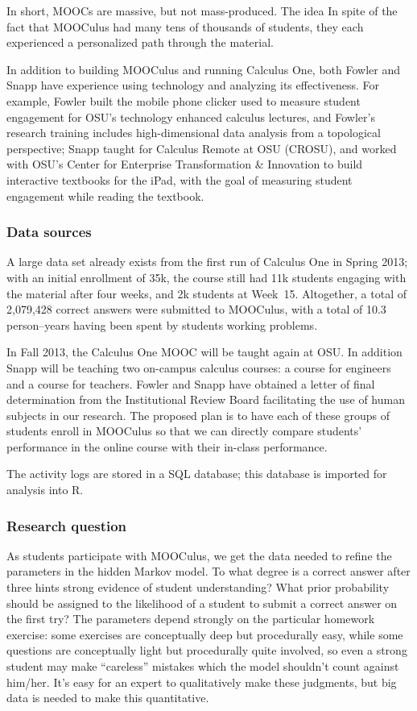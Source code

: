\documentclass[12pt]{article}
\begin{document}
In short, MOOCs are massive, but not mass-produced.  The idea In spite
of the fact that MOOCulus had many tens of thousands of students, they
each experienced a personalized path through the material.

In addition to building MOOCulus and running Calculus One, both Fowler
and Snapp have experience using technology and analyzing its
effectiveness.  For example, Fowler built the mobile phone clicker
used to measure student engagement for OSU's technology enhanced
calculus lectures, and Fowler's research training includes
high-dimensional data analysis from a topological perspective; Snapp
taught for Calculus Remote at OSU (CROSU), and worked with OSU's
Center for Enterprise Transformation \& Innovation to build
interactive textbooks for the iPad, with the goal of measuring student
engagement while reading the textbook.

\subsubsection*{Data sources}

A large data set already exists from the first run of Calculus One in
Spring 2013; with an initial enrollment of 35k, the course still had
11k students engaging with the material after four weeks, and 2k
students at Week~15.  Altogether, a total of 2,079,428 correct answers
were submitted to MOOCulus, with a total of 10.3 person--years having
been spent by students working problems.

In Fall 2013, the Calculus One MOOC will be taught again at OSU.  In
addition Snapp will be teaching two on-campus calculus courses: a
course for engineers and a course for teachers.  Fowler and Snapp have
obtained a letter of final determination from the Institutional Review
Board facilitating the use of human subjects in our research.  The
proposed plan is to have each of these groups of students enroll in
MOOCulus so that we can directly compare students' performance in the
online course with their in-class performance.

The activity logs are stored in a SQL database; this database is
imported for analysis into R.

\subsubsection*{Research question}

As students participate with MOOCulus, we get the data needed to
refine the parameters in the hidden Markov model.  To what degree is a
correct answer after three hints strong evidence of student
understanding?  What prior probability should be assigned to the
likelihood of a student to submit a correct answer on the first try?
The parameters depend strongly on the particular homework exercise:
some exercises are conceptually deep but procedurally easy, while some
questions are conceptually light but procedurally quite involved, so
even a strong student may make ``careless'' mistakes which the model
shouldn't count against him/her.  It's easy for an expert to
qualitatively make these judgments, but big data is needed to make
this quantitative.
\end{document}
